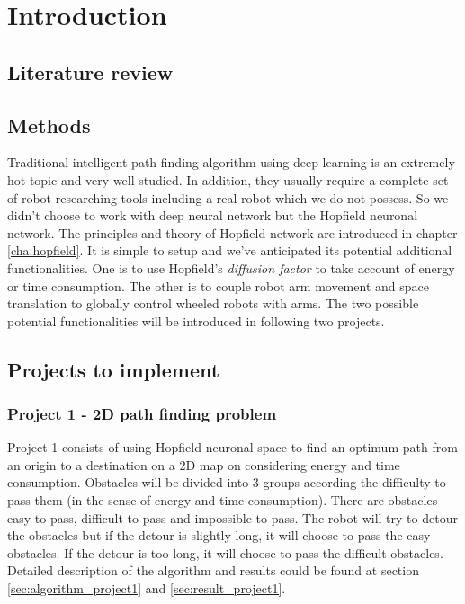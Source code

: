 \chapter{Introduction}
\label{cha:introduction}
\section{Literature review}
\label{sec:review}

\section{Methods}
\label{sec:method}
Traditional intelligent path finding algorithm using deep learning is an extremely hot topic and very well studied.
In addition, they usually require a complete set of robot researching tools including a real robot which we do not possess.
So we didn't choose to work with deep neural network but the Hopfield neuronal network.
The principles and theory of Hopfield network are introduced in chapter \ref{cha:hopfield}.
It is simple to setup and we've anticipated its potential additional functionalities.
One is to use Hopfield's \textit{diffusion factor} to take account of energy or time consumption.
The other is to couple robot arm movement and space translation to globally control wheeled robots with arms.
The two possible potential functionalities will be introduced in following two projects.


\section{Projects to implement}
\label{sec:projects}

\subsection{Project 1 - 2D path finding problem}
\label{ssec:project1}

Project 1 consists of using Hopfield neuronal space to find an optimum path from an origin to a destination on a 2D map
on considering energy and time consumption.
Obstacles will be divided into 3 groups according the difficulty to pass them (in the sense of energy and time consumption).
There are obstacles easy to pass, difficult to pass and impossible to pass.
The robot will try to detour the obstacles but if the detour is slightly long, it will choose to pass the easy obstacles.
If the detour is too long, it will choose to pass the difficult obstacles.
Detailed description of the algorithm and results could be found at section \ref{sec:algorithm_project1} and
\ref{sec:result_project1}.


